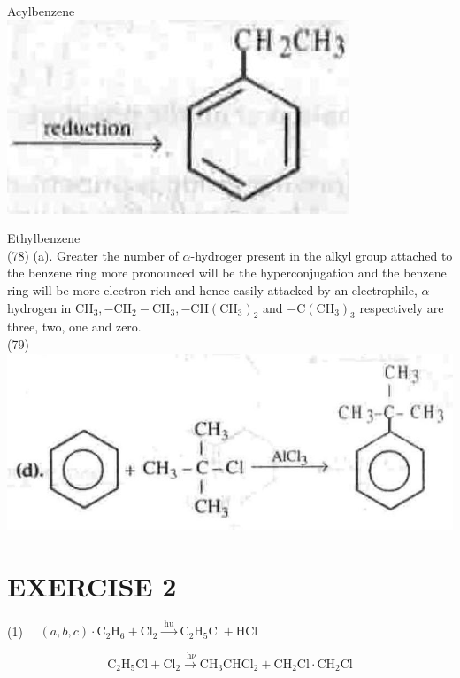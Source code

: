 \documentclass[10pt]{article}
\begin{document}
Acylbenzene\\
\includegraphics[max width=\textwidth, center]{2025_01_28_8470952b98110cec3aabg-244(8)}

Ethylbenzene\\
(78) (a). Greater the number of $\alpha$-hydroger present in the alkyl group attached to the benzene ring more pronounced will be the hyperconjugation and the benzene ring will be more electron rich and hence easily attacked by an electrophile, $\alpha$-hydrogen in $\mathrm{CH}_{3},-\mathrm{CH}_{2}-\mathrm{CH}_{3},-\mathrm{CH}\left(\mathrm{CH}_{3}\right)_{2}$ and $-\mathrm{C}\left(\mathrm{CH}_{3}\right)_{3}$ respectively are three, two, one and zero.\\
(79)\\
\includegraphics[max width=\textwidth, center]{2025_01_28_8470952b98110cec3aabg-245(7)}

\section*{EXERCISE 2}
(1) $\quad(a, b, c) \cdot \mathrm{C}_{2} \mathrm{H}_{6}+\mathrm{Cl}_{2} \xrightarrow{\text { hu }} \mathrm{C}_{2} \mathrm{H}_{5} \mathrm{Cl}+\mathrm{HCl}$

$$
\mathrm{C}_{2} \mathrm{H}_{5} \mathrm{Cl}+\mathrm{Cl}_{2} \xrightarrow{\mathrm{~h} \nu} \mathrm{CH}_{3} \mathrm{CHCl}_{2}+\mathrm{CH}_{2} \mathrm{Cl} \cdot \mathrm{CH}_{2} \mathrm{Cl}
$$
\end{document}
